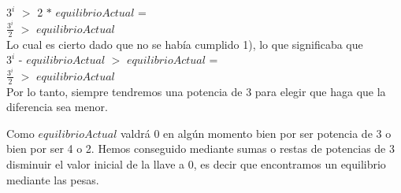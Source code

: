 $3^{i}$ $>$ 2 $\ast$ $equilibrioActual$ = \\

$\frac{3^{i}}{2}$ $>$ $equilibrioActual$ \\

Lo cual es cierto dado que no se había cumplido 1), lo que significaba que  \\

$3^i$ - $equilibrioActual$ $>$ $equilibrioActual$ = \\

$\frac{3^i}{2}$ $>$ $equilibrioActual$ \\

Por lo tanto, siempre tendremos una potencia de 3 para elegir que haga que la diferencia sea menor.

Como $equilibrioActual$ valdrá 0 en algún momento bien por ser potencia de 3 o bien por ser 4 o 2.
Hemos conseguido mediante sumas o restas de potencias de 3 disminuir el valor inicial de la llave a  0, es decir que encontramos un equilibrio mediante las pesas.